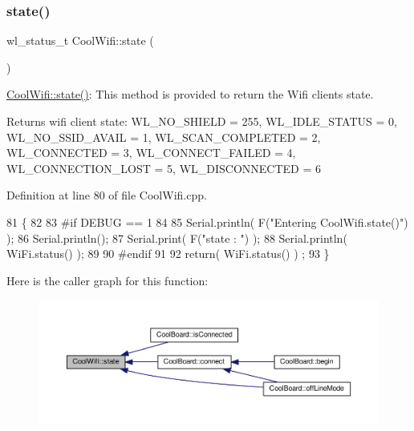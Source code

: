 \subsubsection{\texorpdfstring{state()}{state()}}
{\footnotesize\ttfamily wl\+\_\+status\+\_\+t Cool\+Wifi\+::state (\begin{DoxyParamCaption}{ }\end{DoxyParamCaption})}

\hyperlink{class_cool_wifi_a1c7b4d82a4098d346e7593dce92039fa}{Cool\+Wifi\+::state()}\+: This method is provided to return the Wifi client\textquotesingle{}s state. \begin{DoxyReturn}{Returns}
wifi client state\+: W\+L\+\_\+\+N\+O\+\_\+\+S\+H\+I\+E\+LD = 255, W\+L\+\_\+\+I\+D\+L\+E\+\_\+\+S\+T\+A\+T\+US = 0, W\+L\+\_\+\+N\+O\+\_\+\+S\+S\+I\+D\+\_\+\+A\+V\+A\+IL = 1, W\+L\+\_\+\+S\+C\+A\+N\+\_\+\+C\+O\+M\+P\+L\+E\+T\+ED = 2, W\+L\+\_\+\+C\+O\+N\+N\+E\+C\+T\+ED = 3, W\+L\+\_\+\+C\+O\+N\+N\+E\+C\+T\+\_\+\+F\+A\+I\+L\+ED = 4, W\+L\+\_\+\+C\+O\+N\+N\+E\+C\+T\+I\+O\+N\+\_\+\+L\+O\+ST = 5, W\+L\+\_\+\+D\+I\+S\+C\+O\+N\+N\+E\+C\+T\+ED = 6 
\end{DoxyReturn}


Definition at line 80 of file Cool\+Wifi.\+cpp.


\begin{DoxyCode}
81 \{
82 
83 \textcolor{preprocessor}{#if DEBUG == 1 }
84 
85     Serial.println( F(\textcolor{stringliteral}{"Entering CoolWifi.state()"}) );
86     Serial.println();   
87     Serial.print( F(\textcolor{stringliteral}{"state : "}) );
88     Serial.println( WiFi.status() );
89 
90 \textcolor{preprocessor}{#endif}
91     
92     \textcolor{keywordflow}{return}( WiFi.status() ) ;
93 \}
\end{DoxyCode}
Here is the caller graph for this function\+:\nopagebreak
\begin{figure}[H]
\begin{center}
\leavevmode
\includegraphics[width=350pt]{d7/d29/class_cool_wifi_a1c7b4d82a4098d346e7593dce92039fa_icgraph}
\end{center}
\end{figure}


